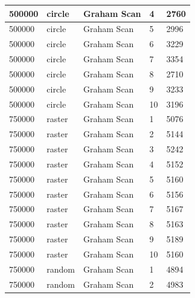 \documentclass[12pt]{article}
\begin{document}
\begin{longtable}{|l|l|l|l|l|}
500000       & circle            & Graham Scan & 4          & 2760                          \\ \hline
500000       & circle            & Graham Scan & 5          & 2996                          \\ \hline
500000       & circle            & Graham Scan & 6          & 3229                          \\ \hline
500000       & circle            & Graham Scan & 7          & 3354                          \\ \hline
500000       & circle            & Graham Scan & 8          & 2710                          \\ \hline
500000       & circle            & Graham Scan & 9          & 3233                          \\ \hline
500000       & circle            & Graham Scan & 10         & 3196                          \\ \hline
750000       & raster            & Graham Scan & 1          & 5076                          \\ \hline
750000       & raster            & Graham Scan & 2          & 5144                          \\ \hline
750000       & raster            & Graham Scan & 3          & 5242                          \\ \hline
750000       & raster            & Graham Scan & 4          & 5152                          \\ \hline
750000       & raster            & Graham Scan & 5          & 5160                          \\ \hline
750000       & raster            & Graham Scan & 6          & 5156                          \\ \hline
750000       & raster            & Graham Scan & 7          & 5167                          \\ \hline
750000       & raster            & Graham Scan & 8          & 5163                          \\ \hline
750000       & raster            & Graham Scan & 9          & 5189                          \\ \hline
750000       & raster            & Graham Scan & 10         & 5160                          \\ \hline
750000       & random            & Graham Scan & 1          & 4894                          \\ \hline
750000       & random            & Graham Scan & 2          & 4983                          \\ \hline

\end{longtable}
\end{document}
